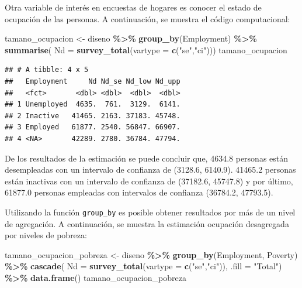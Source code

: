 \documentclass[
  spanish,
  12pt,
]{book}
\newenvironment{Shaded}{\begin{snugshade}}{\end{snugshade}}
\newcommand{\AttributeTok}[1]{\textcolor[rgb]{0.13,0.29,0.53}{#1}}
\newcommand{\FunctionTok}[1]{\textcolor[rgb]{0.13,0.29,0.53}{\textbf{#1}}}
\newcommand{\NormalTok}[1]{#1}
\newcommand{\OtherTok}[1]{\textcolor[rgb]{0.56,0.35,0.01}{#1}}
\newcommand{\SpecialCharTok}[1]{\textcolor[rgb]{0.81,0.36,0.00}{\textbf{#1}}}
\newcommand{\StringTok}[1]{\textcolor[rgb]{0.31,0.60,0.02}{#1}}
\begin{document}
Otra variable de interés en encuestas de hogares es conocer el estado de ocupación de las personas. A continuación, se muestra el código computacional:

\begin{Shaded}
\begin{Highlighting}[]
\NormalTok{tamano\_ocupacion }\OtherTok{\textless{}{-}}\NormalTok{ diseno }\SpecialCharTok{\%\textgreater{}\%} 
                    \FunctionTok{group\_by}\NormalTok{(Employment) }\SpecialCharTok{\%\textgreater{}\%} 
                    \FunctionTok{summarise}\NormalTok{( }\AttributeTok{Nd =} \FunctionTok{survey\_total}\NormalTok{(}\AttributeTok{vartype =} \FunctionTok{c}\NormalTok{(}\StringTok{"se"}\NormalTok{,}\StringTok{"ci"}\NormalTok{)))}
\NormalTok{tamano\_ocupacion}
\end{Highlighting}
\end{Shaded}

\begin{verbatim}
## # A tibble: 4 x 5
##   Employment     Nd Nd_se Nd_low Nd_upp
##   <fct>       <dbl> <dbl>  <dbl>  <dbl>
## 1 Unemployed  4635.  761.  3129.  6141.
## 2 Inactive   41465. 2163. 37183. 45748.
## 3 Employed   61877. 2540. 56847. 66907.
## 4 <NA>       42289. 2780. 36784. 47794.
\end{verbatim}

De los resultados de la estimación se puede concluir que, 4634.8 personas están desempleadas con un intervalo de confianza de (3128.6, 6140.9). 41465.2 personas están inactivas con un intervalo de confianza de (37182.6, 45747.8) y por último, 61877.0 personas empleadas con intervalos de confianza (36784.2, 47793.5).

Utilizando la función \texttt{group\_by} es posible obtener resultados por más de un nivel de agregación. A continuación, se muestra la estimación ocupación desagregada por niveles de pobreza:

\begin{Shaded}
\begin{Highlighting}[]
\NormalTok{tamano\_ocupacion\_pobreza }\OtherTok{\textless{}{-}}\NormalTok{ diseno }\SpecialCharTok{\%\textgreater{}\%} 
                            \FunctionTok{group\_by}\NormalTok{(Employment, Poverty) }\SpecialCharTok{\%\textgreater{}\%} 
                            \FunctionTok{cascade}\NormalTok{( }\AttributeTok{Nd =} \FunctionTok{survey\_total}\NormalTok{(}\AttributeTok{vartype =}                                     \FunctionTok{c}\NormalTok{(}\StringTok{"se"}\NormalTok{,}\StringTok{"ci"}\NormalTok{)), }\AttributeTok{.fill =} \StringTok{"Total"}\NormalTok{) }\SpecialCharTok{\%\textgreater{}\%}
                            \FunctionTok{data.frame}\NormalTok{()}
\NormalTok{tamano\_ocupacion\_pobreza}
\end{Highlighting}
\end{Shaded}
\end{document}
